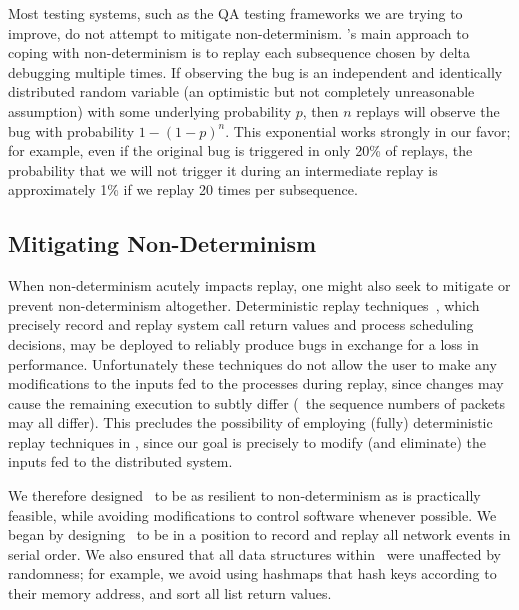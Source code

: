 Most testing systems, such as the QA testing frameworks we are
trying to improve, do not attempt to mitigate non-determinism.
\projectname's main approach to coping with non-determinism
is to replay each subsequence chosen
by delta debugging multiple times. If observing the bug
is an independent and identically distributed random variable (an optimistic
but not completely unreasonable assumption) with some
underlying probability $p$, then $n$
replays will observe the bug with probability $1-(1-p)^{n}$. This exponential
works strongly in our favor; for example, even if the original bug is
triggered in only 20\% of replays, the probability that we will not trigger
it during an intermediate replay is approximately
1\% if we replay 20 times per subsequence.

\subsection{Mitigating Non-Determinism}
\label{subsec:mitigating}

When non-determinism acutely impacts replay, one might also seek to mitigate or prevent non-determinism altogether.
Deterministic replay techniques~\cite{Dunlap:2002:REI:844128.844148,Geels:2006:RDD:1267359.1267386},
which precisely record and replay system call return values and process
scheduling decisions,
may be deployed to reliably produce bugs in exchange for a loss in performance.
Unfortunately these techniques do not allow the user to make any modifications to the inputs fed to the
processes during replay, since changes may cause the remaining execution to
subtly differ (\eg~the sequence numbers of packets may all differ).
This precludes the possibility of employing (fully) deterministic replay techniques in
\projectname, since our goal is precisely to modify (and eliminate) the inputs fed to the
distributed system.

We therefore designed \projectname~to be as resilient to non-determinism as is
practically feasible, while avoiding modifications to control software whenever possible.
We began by designing \projectname~to be in a position to
record and replay all network events in serial order. We also ensured that all
data structures within \projectname~were unaffected by randomness; for example,
we avoid using hashmaps that hash keys according to their memory address,
and sort all list return values.

